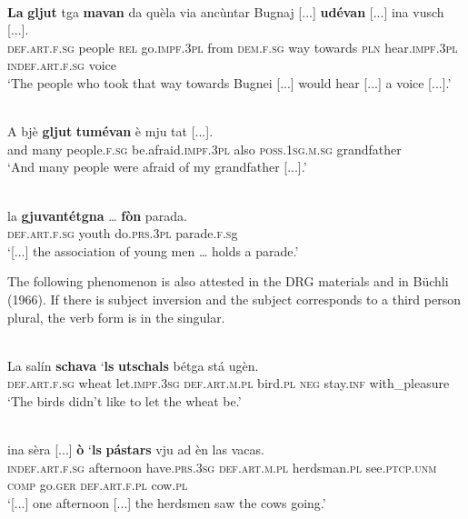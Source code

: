 \ea
\label{}
 {\citealt[142f.]{Büchli1966}}\\
\gll \textbf{La} \textbf{gljut} tga \textbf{mavan} da quèla via ancùntar Bugnaj [...] \textbf{udévan} [...] ina vusch [...].\\
\textsc{def.art.f.sg} people \textsc{rel} go.\textsc{impf.3pl} from \textsc{dem.f.sg} way towards \textsc{pln} {} hear.\textsc{impf.3pl} {} \textsc{indef.art.f.sg} voice\\
\glt `The people who took that way towards Bugnei [...] would hear [...] a voice [...].'
\z

\ea
\label{}
\\
\gll  A bjè \textbf{gljut} \textbf{tumévan} è mju tat [...].  \\
and many people.\textsc{f.sg} be.afraid.\textsc{impf.3pl} also \textsc{poss.1sg.m.sg} grandfather\\
\glt `And many people were afraid of my grandfather [...].'
\z

\ea
\label{}
\\
\gll    [...] la \textbf{gjuvantétgna} … \textbf{fòn} parada.\\
{} \textsc{def.art.f.sg} youth {} do.\textsc{prs.3pl} parade.\textsc{f.s}g\\
\glt `[...] the association of young men … holds a parade.'
\z

The following phenomenon is also attested in the DRG materials and in Büchli (1966). If there is subject inversion and the subject corresponds to a third person plural, the verb form is in the singular.


\ea
\label{}
\\
\gll La salín \textbf{schava} `\textbf{ls} \textbf{utschals} bétga stá ugèn.\\
\textsc{def.art.f.sg} wheat let.\textsc{impf.3sg} \textsc{def.art.m.pl} bird.\textsc{pl} \textsc{neg} stay.\textsc{inf} with\_pleasure\\
\glt `The birds didn't like to let the wheat be.'
\z

\ea
\label{}
 {\citealt[28]{Büchli1966}}\\
\gll [...] ina sèra [...] \textbf{ò} `\textbf{ls} \textbf{pástars} vju ad èn las vacas.\\
{} \textsc{indef.art.f.sg} afternoon {} have.\textsc{prs.3sg} \textsc{def.art.m.pl} herdsman.\textsc{pl} see.\textsc{ptcp.unm} \textsc{comp} go.\textsc{ger} \textsc{def.art.f.pl} cow.\textsc{pl}\\
\glt `[...] one afternoon [...] the herdsmen saw the cows going.'
\z

